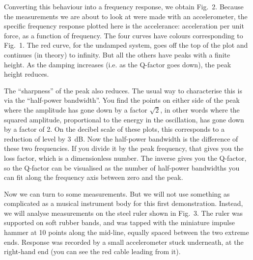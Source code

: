   Converting this behaviour into a frequency response, we obtain Fig.\ 2. 
  Because the measurements we are about to look at were made with an 
  accelerometer, the specific frequency response plotted here is the 
  accelerance: acceleration per unit force, as a function of frequency. The 
  four curves have colours corresponding to Fig.\ 1. The red curve, for the 
  undamped system, goes off the top of the plot and continues (in theory) to 
  infinity. But all the others have peaks with a finite height. As the damping 
  increases (i.e. as the Q-factor goes down), the peak height reduces. 


  The “sharpness” of the peak also reduces. The usual way to characterise this 
  is via the “half-power bandwidth”. You find the points on either side of the 
  peak where the amplitude has gone down by a factor $\sqrt{2}$, in other words 
  where the squared amplitude, proportional to the energy in the oscillation, 
  has gone down by a factor of 2. On the decibel scale of these plots, this 
  corresponds to a reduction of level by 3~dB. Now the half-power bandwidth is 
  the difference of these two frequencies. If you divide it by the peak 
  frequency, that gives you the loss factor, which is a dimensionless number. 
  The inverse gives you the Q-factor, so the Q-factor can be visualised as the 
  number of half-power bandwidths you can fit along the frequency axis between 
  zero and the peak. 

  Now we can turn to some measurements. But we will not use something as 
  complicated as a musical instrument body for this first demonstration. 
  Instead, we will analyse measurements on the steel ruler shown in Fig.\ 3. 
  The ruler was supported on soft rubber bands, and was tapped with the 
  miniature impulse hammer at 10 points along the mid-line, equally spaced 
  between the two extreme ends. Response was recorded by a small accelerometer 
  stuck underneath, at the right-hand end (you can see the red cable leading 
  from it). 


